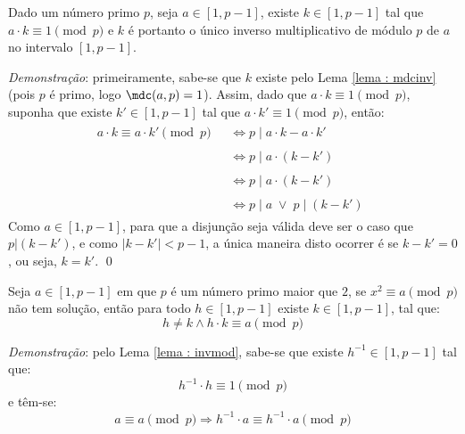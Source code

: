 \begin{lema} Dado um número primo $p$, seja 
$a \in [1, p-1]$, existe $k \in [1, p-1]$ tal que $ a \cdot k \equiv 1 \pmod p$ e $k$ é portanto o único inverso multiplicativo de  módulo $p$ de $a$ no intervalo $[1, p-1]$. \label{lema : invmod}
\end{lema}
\noindent
\textit{Demonstração}: primeiramente, sabe-se que $k$ existe pelo Lema \ref{lema : mdcinv} (pois $p$ é primo, logo $\mdc(a, p) = 1$). Assim, dado que $a \cdot k \equiv 1 \pmod p$, suponha que existe $k' \in [1, p-1]$ tal que $a \cdot k' \equiv 1 \pmod p$, então:
\begin{align*}
    a \cdot k \equiv a \cdot k' \pmod p \;
    &\begin{aligned}
        \Longleftrightarrow p \mid a \cdot k - a \cdot k'
    \end{aligned} \\
    &\begin{aligned}
        \Longleftrightarrow p \mid a \cdot (k - k')
    \end{aligned} \\
    &\begin{aligned}
        \Longleftrightarrow p \mid a \cdot (k - k')
    \end{aligned}
    \\
    &\begin{aligned}
        \Longleftrightarrow p \mid a \; \lor \; p \mid (k - k')
    \end{aligned}
\end{align*}
Como $a \in [1, p-1]$, para que a disjunção seja válida deve ser o caso que $p | (k - k')$, e como $|k - k'| < p-1$, a única maneira disto ocorrer é se $k - k' = 0$, ou seja, $k = k'$. \qed
\begin{lema} Seja $a \in [1, p-1]$ em que $p$ é um número primo maior que $2$, se $x^2 \equiv a \pmod p$ não tem solução, então para todo $h \in [1, p-1]$ existe $k \in [1, p-1]$, tal que: \label{lema : hkequivamodp}
    \begin{equation*} 
        h \neq k \land h \cdot k \equiv a \pmod p 
    \end{equation*}
\end{lema}
\noindent \textit{Demonstração}: pelo Lema \ref{lema : invmod}, sabe-se que existe $h^{-1} \in [1, p-1]$ tal que:
\begin{equation*}
    h^{-1} \cdot h \equiv 1 \pmod p
\end{equation*}
e têm-se:
\begin{equation*}
    a \equiv a \pmod p \Rightarrow h^{-1} \cdot a \equiv h^{-1} \cdot a \pmod p
\end{equation*}
